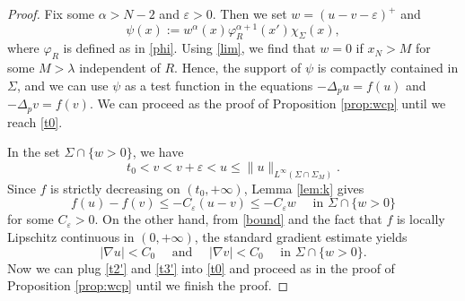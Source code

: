 \documentclass[reqno]{amsart}
\theoremstyle{plain}
\theoremstyle{definition}
\theoremstyle{remark}
\begin{document}
	\begin{proof}
		Fix some $\alpha>N-2$ and $\varepsilon>0$. Then we set $w=(u-v-\varepsilon)^+$ and
		\begin{equation}\label{psi}
			\psi(x) := w^{\alpha}(x) \varphi_R^{\alpha+1}(x') \chi_{\Sigma}(x),
		\end{equation}
		where $\varphi_R$ is defined as in \eqref{phi}.
		Using \eqref{lim}, we find that $w=0$ if $x_N>M$ for some $M>\lambda$ independent of $R$. Hence, the support of $\psi$ is compactly contained in $\Sigma$, and we can use $\psi$ as a test function in the equations $-\Delta_p u = f(u)$ and $-\Delta_p v = f(v)$. We can proceed as the proof of Proposition \ref{prop:wcp} until we reach \eqref{t0}.
		
		In the set ${\Sigma}\cap\{w > 0\}$, we have
		\begin{equation}\label{bound}
			t_0 < v < v+\varepsilon < u \le \|u\|_{L^\infty(\Sigma\cap \Sigma_M)}.
		\end{equation}
		Since $f$ is strictly decreasing on $(t_0,+\infty)$, Lemma \ref{lem:k} gives
		\begin{equation}\label{t2'}
			f(u) - f(v) \le - C_\varepsilon (u-v) \le - C_\varepsilon w \quad\text{ in } {\Sigma}\cap\{w > 0\}
		\end{equation}
		for some $C_\varepsilon>0$.
		On the other hand, from \eqref{bound} and the fact that $f$ is locally Lipschitz continuous in $(0,+\infty)$, the standard gradient estimate yields
		\begin{equation}\label{t3'}
			|\nabla u| < C_0 \quad\text{ and }\quad |\nabla v| < C_0 \quad\text{ in } {\Sigma}\cap\{w > 0\}.
		\end{equation}
		Now we can plug \eqref{t2'} and \eqref{t3'} into \eqref{t0} and proceed as in the proof of Proposition \ref{prop:wcp} until we finish the proof.
	\end{proof}
	
\end{document}
